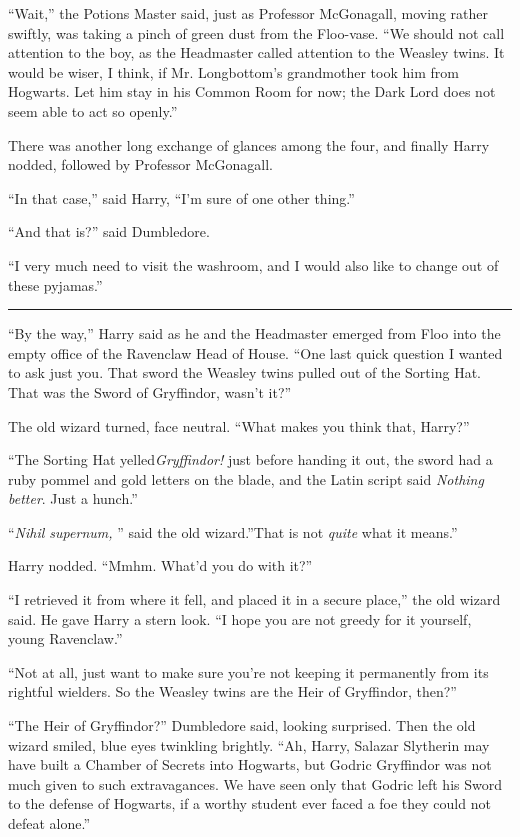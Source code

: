``Wait,'' the Potions Master said, just as Professor McGonagall, moving
rather swiftly, was taking a pinch of green dust from the Floo-vase.
``We should not call attention to the boy, as the Headmaster called
attention to the Weasley twins. It would be wiser, I think, if Mr.
Longbottom's grandmother took him from Hogwarts. Let him stay in his
Common Room for now; the Dark Lord does not seem able to act so
openly.''

There was another long exchange of glances among the four, and finally
Harry nodded, followed by Professor McGonagall.

``In that case,'' said Harry, ``I'm sure of one other thing.''

``And that is?'' said Dumbledore.

``I very much need to visit the washroom, and I would also like to
change out of these pyjamas.''

\begin{center}\rule{3in}{0.4pt}\end{center}

``By the way,'' Harry said as he and the Headmaster emerged from Floo
into the empty office of the Ravenclaw Head of House. ``One last quick
question I wanted to ask just you. That sword the Weasley twins pulled
out of the Sorting Hat. That was the Sword of Gryffindor, wasn't it?''

The old wizard turned, face neutral. ``What makes you think that,
Harry?''

``The Sorting Hat yelled\emph{Gryffindor!} just before handing it out,
the sword had a ruby pommel and gold letters on the blade, and the Latin
script said \emph{Nothing better}. Just a hunch.''

``\emph{Nihil supernum,} '' said the old wizard.''That is not \emph{quite}
what it means.''

Harry nodded. ``Mmhm. What'd you do with it?''

``I retrieved it from where it fell, and placed it in a secure place,''
the old wizard said. He gave Harry a stern look. ``I hope you are not
greedy for it yourself, young Ravenclaw.''

``Not at all, just want to make sure you're not keeping it permanently
from its rightful wielders. So the Weasley twins are the Heir of
Gryffindor, then?''

``The Heir of Gryffindor?'' Dumbledore said, looking surprised. Then the
old wizard smiled, blue eyes twinkling brightly. ``Ah, Harry, Salazar
Slytherin may have built a Chamber of Secrets into Hogwarts, but Godric
Gryffindor was not much given to such extravagances. We have seen only
that Godric left his Sword to the defense of Hogwarts, if a worthy
student ever faced a foe they could not defeat alone.''

